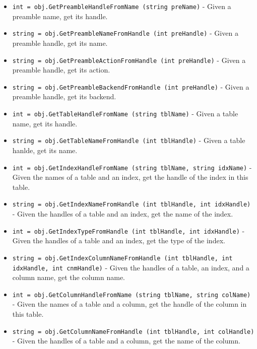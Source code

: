 \begin{itemize}
\item  \verb|int = obj.GetPreambleHandleFromName (string preName)| -  Given a preamble name, get its handle.

\item  \verb|string = obj.GetPreambleNameFromHandle (int preHandle)| -  Given a preamble handle, get its name.

\item  \verb|string = obj.GetPreambleActionFromHandle (int preHandle)| -  Given a preamble handle, get its action.

\item  \verb|string = obj.GetPreambleBackendFromHandle (int preHandle)| -  Given a preamble handle, get its backend.

\item  \verb|int = obj.GetTableHandleFromName (string tblName)| -  Given a table name, get its handle.

\item  \verb|string = obj.GetTableNameFromHandle (int tblHandle)| -  Given a table hanlde, get its name.

\item  \verb|int = obj.GetIndexHandleFromName (string tblName, string idxName)| -  Given the names of a table and an index, get the handle of the index in this table.

\item  \verb|string = obj.GetIndexNameFromHandle (int tblHandle, int idxHandle)| -  Given the handles of a table and an index, get the name of the index.

\item  \verb|int = obj.GetIndexTypeFromHandle (int tblHandle, int idxHandle)| -  Given the handles of a table and an index, get the type of the index.

\item  \verb|string = obj.GetIndexColumnNameFromHandle (int tblHandle, int idxHandle, int cnmHandle)| -  Given the handles of a table, an index, and a column name, get the column name.

\item  \verb|int = obj.GetColumnHandleFromName (string tblName, string colName)| -  Given the names of a table and a column, get the handle of the column in this table.

\item  \verb|string = obj.GetColumnNameFromHandle (int tblHandle, int colHandle)| -  Given the handles of a table and a column, get the name of the column.


\end{itemize}
